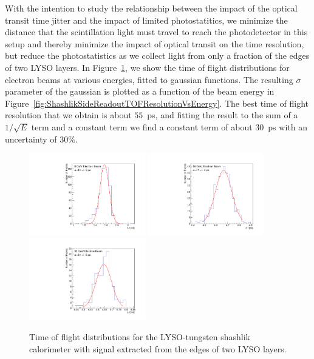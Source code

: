 \documentclass[11pt]{article}
\begin{document}
With the intention to study the relationship between the impact of the 
optical transit time jitter and the impact of limited photostatitics,
we minimize the distance that the scintillation light
must travel to reach the photodetector in this setup and thereby minimize the
impact of optical transit on the time resolution, but reduce the photostatistics 
as we collect light from only a fraction of the edges of two LYSO layers. 
In Figure~\ref{fig:ShashlikSideReadoutTOF}, we show the 
time of flight distributions for electron beams at various energies, 
fitted to gaussian functions. The resulting
$\sigma$ parameter of the gaussian is plotted as a function of the
beam energy in Figure~\ref{fig:ShashlikSideReadoutTOFResolutionVsEnergy}.
The best time of flight resolution that we obtain is about $55$~ps, and
fitting the result to the sum of a $1/\sqrt{E}$ term and a constant term
we find a constant term of about $30$~ps with an uncertainty of $30\%$. 

\begin{figure}[h] \centering
\includegraphics[width=0.45\textwidth]{figs/TOF_ShashlikSideReadout_Electron_8GeV} 
\includegraphics[width=0.45\textwidth]{figs/TOF_ShashlikSideReadout_Electron_16GeV} 
\includegraphics[width=0.45\textwidth]{figs/TOF_ShashlikSideReadout_Electron_32GeV} 
\caption{ Time of flight distributions for the LYSO-tungsten shashlik calorimeter
with signal extracted from the edges of two LYSO layers. } 
\label{fig:ShashlikSideReadoutTOF}
\end{figure}
\end{document}
